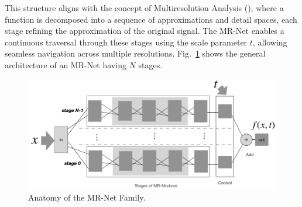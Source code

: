 This structure aligns with the concept of Multiresolution Analysis (\cite{mallat-mr89}), where a function is decomposed into a sequence of approximations and detail spaces, each stage refining the approximation of the original signal. The MR-Net enables a continuous traversal through these stages using the scale parameter \(t\), allowing seamless navigation across multiple resolutions. Fig.~\ref{f:mrnet-arch} shows the general architecture of an MR-Net having \(N\) stages.

\begin{figure}[!h]
\centering
\includegraphics[width=0.96\linewidth]{img/ch4/mr-net-stages-v2.png}
\caption{Anatomy of the MR-Net Family.}
\label{f:mrnet-arch}
\end{figure}








